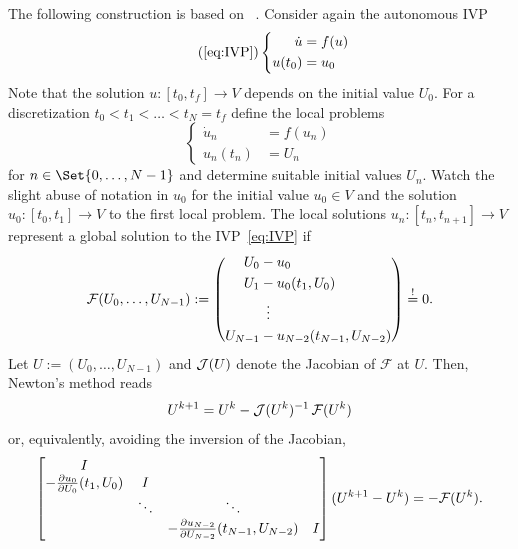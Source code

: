 The following construction is based on \citeauthor{Gander2007}~\cite{Gander2007}.
Consider again the autonomous \ac{IVP}
\begin{equation}
  \tag{\ref*{eq:IVP}}
  \left\{
  \begin{aligned}
    \dot u &= f(u) \\
    u(t_0) &= u_0
  \end{aligned}
  \right.
\end{equation}
Note that the solution $u : [t_0,t_f] \to V $ depends on the initial value $U_0$.
For a discretization $t_0 < t_1 < \ldots < t_N = t_f$
define the local problems
\begin{equation}
  \left\{
  \begin{aligned}
    \dot u_n &= f(u_n) \\
    u_n(t_n) &= U_n
  \end{aligned}
  \right.
\end{equation}
for $n \in \Set{0,\ldots,N-1}$
and determine suitable initial values $U_n$.
Watch the slight abuse of notation in $u_0$
for the initial value $u_0 \in V$
and the solution $u_0 : [t_0,t_1] \to V$ to the first local problem.
The local solutions $u_n : [t_n,t_{n+1}] \to V$ represent a global solution to the \ac{IVP}~\eqref{eq:IVP} if
\begin{equation}
  \mathcal F(U_0, \ldots, U_{N-1}) :=
  \left(
  \begin{aligned}
    U_0 &- u_0 \\
    U_1 &- u_0(t_1, U_0) \\
    &\vdotswithin{-} \\
    U_{N-1} &- u_{N-2}(t_{N-1}, U_{N-2})
  \end{aligned}
  \right)
  \overset{!}{=} 0.
\end{equation}
Let $U := (U_0, \ldots, U_{N-1})$ and $\Jac(U)$ denote the Jacobian of $\mathcal F$ at $U$.
Then, Newton's method reads
\begin{equation}
  U^{k+1} = U^k - \mathop{\Jac(U^k)^{-1}} \mathcal F(U^k)
\end{equation}
or, equivalently, avoiding the inversion of the Jacobian,
\begin{equation}
  \begin{bmatrix}
    I \\
    -\pdiff{U_0}{u_0}(t_1, U_0) & I \\
    & \ddots & \ddots \\
    && -\pdiff{U_{N-2}}{u_{N-2}}(t_{N-1}, U_{N-2}) & I
  \end{bmatrix}
  (U^{k+1} - U^k) = -\mathcal F(U^k)
  .
\end{equation}
